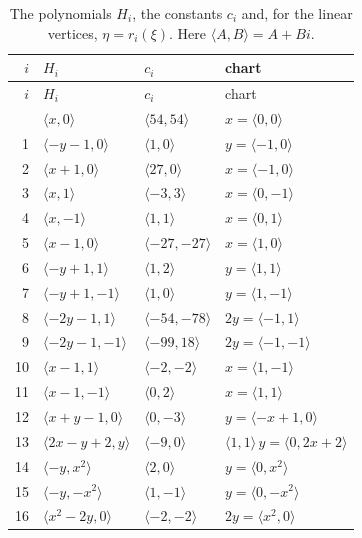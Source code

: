 \documentclass[11pt]{article}
\begin{document}
\clearpage
\begingroup\small
\setlength{\LTcapwidth}{\textwidth}
\begin{longtable}{@{}rlll@{}}
\caption{The polynomials $H_i$, the constants $c_i$ and, for the linear vertices, $\eta=r_i(\xi)$. Here $\langle A,B\rangle=A+Bi$.}\label{tab:vert1}\\
\hline $i$ & $H_i$ & $c_i$ & chart\\\hline\endfirsthead\hline $i$ & $H_i$ & $c_i$ & chart\\\hline\endhead\hline\endfoot
0 & $\langle x,0\rangle$ & $\langle 54,54\rangle$ & $x=\langle 0,0\rangle$\\
1 & $\langle -y-1,0\rangle$ & $\langle 1,0\rangle$ & $y=\langle -1,0\rangle$\\
2 & $\langle x+1,0\rangle$ & $\langle 27,0\rangle$ & $x=\langle -1,0\rangle$\\
3 & $\langle x,1\rangle$ & $\langle -3,3\rangle$ & $x=\langle 0,-1\rangle$\\
4 & $\langle x,-1\rangle$ & $\langle 1,1\rangle$ & $x=\langle 0,1\rangle$\\
5 & $\langle x-1,0\rangle$ & $\langle -27,-27\rangle$ & $x=\langle 1,0\rangle$\\
6 & $\langle -y+1,1\rangle$ & $\langle 1,2\rangle$ & $y=\langle 1,1\rangle$\\
7 & $\langle -y+1,-1\rangle$ & $\langle 1,0\rangle$ & $y=\langle 1,-1\rangle$\\
8 & $\langle -2y-1,1\rangle$ & $\langle -54,-78\rangle$ & $2y=\langle -1,1\rangle$\\
9 & $\langle -2y-1,-1\rangle$ & $\langle -99,18\rangle$ & $2y=\langle -1,-1\rangle$\\
10 & $\langle x-1,1\rangle$ & $\langle -2,-2\rangle$ & $x=\langle 1,-1\rangle$\\
11 & $\langle x-1,-1\rangle$ & $\langle 0,2\rangle$ & $x=\langle 1,1\rangle$\\
12 & $\langle x+y-1,0\rangle$ & $\langle 0,-3\rangle$ & $y=\langle -x+1,0\rangle$\\
13 & $\langle 2x-y+2,y\rangle$ & $\langle -9,0\rangle$ & $\langle 1,1\rangle\,y=\langle 0,2x+2\rangle$\\
14 & $\langle -y,x^{2}\rangle$ & $\langle 2,0\rangle$ & $y=\langle 0,x^{2}\rangle$\\
15 & $\langle -y,-x^{2}\rangle$ & $\langle 1,-1\rangle$ & $y=\langle 0,-x^{2}\rangle$\\
16 & $\langle x^{2}-2y,0\rangle$ & $\langle -2,-2\rangle$ & $2y=\langle x^{2},0\rangle$\\

\end{longtable}
\end{document}
